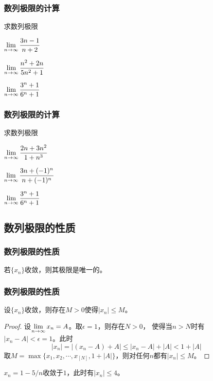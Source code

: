 \documentclass[14pt,notheorems,leqno,xcolor={rgb}]{beamer} %
\begin{document}
\begin{oframe}
\frametitle{数列极限的计算}
\begin{exercise}
求数列极限
\begin{enumlite}
  \item $\lim\limits_{n\to\infty}\dfrac{3n-1}{n+2}$
  \item $\lim\limits_{n\to\infty}\dfrac{n^2+2n}{5n^2+1}$
  \item $\lim\limits_{n\to\infty}\dfrac{3^n+1}{6^n+1}$
\end{enumlite}
\end{exercise}
\end{oframe}

\begin{iframe}
\frametitle{数列极限的计算}
\begin{exercise}
求数列极限
\begin{enumlite}
  \item $\lim\limits_{n\to\infty}\dfrac{2n+3n^2}{1+n^3}$
  \item $\lim\limits_{n\to\infty}\dfrac{3n+(-1)^n}{n+(-1)^n}$
  \item $\lim\limits_{n\to\infty}\dfrac{3^n+1}{6^n+1}$
\end{enumlite}
\end{exercise}
\end{iframe}

\subsection{数列极限的性质}

\begin{iframe}
\frametitle{数列极限的性质}
\begin{property}[唯一性]
若$\{x_n\}$收敛，则其极限是唯一的。
\end{property}
\end{iframe}

\begin{iframe}
\frametitle{数列极限的性质}
\begin{property}[有界性]
设$\{x_n\}$收敛，则存在$M>0$使得$|x_n|\le M$。
\end{property}
\vpause
\begin{proof}
设$\lim\limits_{n\to\infty}x_n=A$。取$\epsilon=1$，则存在$N>0$，
使得当$n>N$时有$|x_n-A|<\epsilon=1$。此时
\[ |x_n|=|(x_n-A)+A|\le|x_n-A|+|A|< 1+|A| \]
取$M=\max\{x_1,x_2,\cdots,x_{[N]},1+|A|\}$，则对任何$n$都有$|x_n|\le M$。
\end{proof}
\vpause
\begin{example*}
$x_n=1-5/n$收敛于$1$，此时有$|x_n|\le4$。
\end{example*}
\end{iframe}
\end{document}
